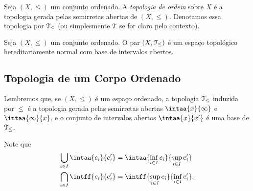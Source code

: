 
\begin{defi}
Seja $(X,\leq)$ um conjunto ordenado. A \emph{topologia de ordem} sobre $X$ é a topologia gerada pelas semirretas abertas de $(X,\leq)$. %
Denotamos essa topologia por $\mathcal{T}_\leq$ (ou simplesmente $\mathcal{T}$ se for claro pelo contexto).
\end{defi}

\begin{prop}
Seja $(X,\leq)$ um conjunto ordenado. O par $(X,\mathcal{T}_\leq)$ é um espaço topológico hereditariamente normal com base de intervalos abertos.
\end{prop}

\subsection{Topologia de um Corpo Ordenado}

Lembremos que, se $(X,\leq)$ é um espaço ordenado, a topologia $\mathcal{T}_\leq$ induzida por $\leq$ é a topologia gerada pelas semirretas abertas $\intaa{x}{\infty}$ e $\intaa{\infty}{x}$, e o conjunto de intervalos abertos $\intaa{x}{x'}$ é uma base de $\mathcal{T}_\leq$.

Note que
	\begin{align*}
	\bigcup_{i \in I} \intaa{e_i}{e'_i} &= \intaa{\inf_{i \in I} e_i}{\sup_{i \in I} e'_i} \\
	\bigcap_{i \in I} \intff{e_i}{e'_i} &= \intff{\sup_{i \in I} e_i}{\inf_{i \in I} e'_i}.
	\end{align*}

